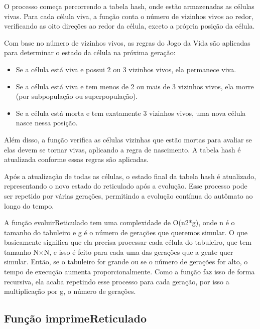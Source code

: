 \documentclass{article}
\begin{document}
O processo começa percorrendo a tabela hash, onde estão armazenadas as células vivas. Para cada célula viva, a função conta o número de vizinhos vivos ao redor, verificando as oito direções ao redor da célula, exceto a própria posição da célula.

Com base no número de vizinhos vivos, as regras do Jogo da Vida são aplicadas para determinar o estado da célula na próxima geração:

 \begin{itemize}

 \item Se a célula está viva e possui 2 ou 3 vizinhos vivos, ela permanece viva.

 \item  Se a célula está viva e tem menos de 2 ou mais de 3 vizinhos vivos, ela morre (por subpopulação ou superpopulação).

\item Se a célula está morta e tem exatamente 3 vizinhos vivos, uma nova célula nasce nessa posição.

 \end{itemize}

Além disso, a função verifica as células vizinhas que estão mortas para avaliar se elas devem se tornar vivas, aplicando a regra de nascimento. A tabela hash é atualizada conforme essas regras são aplicadas.

Após a atualização de todas as células, o estado final da tabela hash é atualizado, representando o novo estado do reticulado após a evolução. Esse processo pode ser repetido por várias gerações, permitindo a evolução contínua do autômato ao longo do tempo.

A função evoluirReticulado tem uma complexidade de O(n2*g), onde 
n é o tamanho do tabuleiro e g é o número de gerações que queremos simular. O que basicamente significa que ela precisa processar cada célula do tabuleiro, que tem tamanho N×N, e isso é feito para cada uma das gerações que a gente quer simular. Então, se o tabuleiro for grande ou se o número de gerações for alto, o tempo de execução aumenta proporcionalmente. Como a função faz isso de forma recursiva, ela acaba repetindo esse processo para cada geração, por isso a multiplicação por g, o número de gerações.

 
\subsection{Função   imprimeReticulado}
\end{document}

